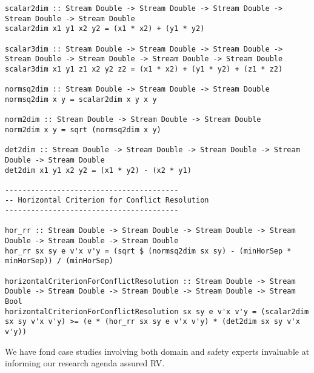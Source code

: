 \begin{lstlisting}[frame=single]
scalar2dim :: Stream Double -> Stream Double -> Stream Double -> Stream Double -> Stream Double
scalar2dim x1 y1 x2 y2 = (x1 * x2) + (y1 * y2)

scalar3dim :: Stream Double -> Stream Double -> Stream Double -> Stream Double -> Stream Double -> Stream Double -> Stream Double
scalar3dim x1 y1 z1 x2 y2 z2 = (x1 * x2) + (y1 * y2) + (z1 * z2)

normsq2dim :: Stream Double -> Stream Double -> Stream Double
normsq2dim x y = scalar2dim x y x y

norm2dim :: Stream Double -> Stream Double -> Stream Double
norm2dim x y = sqrt (normsq2dim x y)

det2dim :: Stream Double -> Stream Double -> Stream Double -> Stream Double -> Stream Double
det2dim x1 y1 x2 y2 = (x1 * y2) - (x2 * y1)

----------------------------------------
-- Horizontal Criterion for Conflict Resolution
----------------------------------------

hor_rr :: Stream Double -> Stream Double -> Stream Double -> Stream Double -> Stream Double -> Stream Double
hor_rr sx sy e v'x v'y = (sqrt $ (normsq2dim sx sy) - (minHorSep * minHorSep)) / (minHorSep)

horizontalCriterionForConflictResolution :: Stream Double -> Stream Double -> Stream Double -> Stream Double -> Stream Double -> Stream Bool
horizontalCriterionForConflictResolution sx sy e v'x v'y = (scalar2dim sx sy v'x v'y) >= (e * (hor_rr sx sy e v'x v'y) * (det2dim sx sy v'x v'y))

\end{lstlisting}


We have fond case studies involving both domain and safety experts
invaluable at informing our research agenda  assured RV.

 









